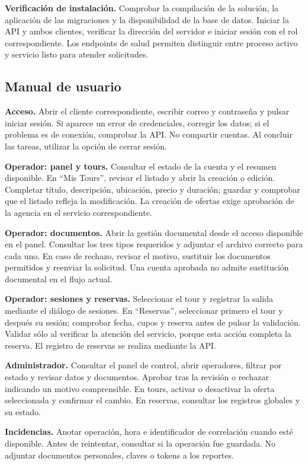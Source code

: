 \textbf{Verificación de instalación.} Comprobar la compilación de la solución, la aplicación de las migraciones y la disponibilidad de la base de datos. Iniciar la API y ambos clientes, verificar la dirección del servidor e iniciar sesión con el rol correspondiente. Los endpoints de salud permiten distinguir entre proceso activo y servicio listo para atender solicitudes.

\subsection{Manual de usuario}
\textbf{Acceso.} Abrir el cliente correspondiente, escribir correo y contraseña y pulsar iniciar sesión. Si aparece un error de credenciales, corregir los datos; si el problema es de conexión, comprobar la API. No compartir cuentas. Al concluir las tareas, utilizar la opción de cerrar sesión.

\textbf{Operador: panel y tours.} Consultar el estado de la cuenta y el resumen disponible. En ``Mis Tours'', revisar el listado y abrir la creación o edición. Completar título, descripción, ubicación, precio y duración; guardar y comprobar que el listado refleja la modificación. La creación de ofertas exige aprobación de la agencia en el servicio correspondiente.

\textbf{Operador: documentos.} Abrir la gestión documental desde el acceso disponible en el panel. Consultar los tres tipos requeridos y adjuntar el archivo correcto para cada uno. En caso de rechazo, revisar el motivo, sustituir los documentos permitidos y reenviar la solicitud. Una cuenta aprobada no admite sustitución documental en el flujo actual.

\textbf{Operador: sesiones y reservas.} Seleccionar el tour y registrar la salida mediante el diálogo de sesiones. En ``Reservas'', seleccionar primero el tour y después su sesión; comprobar fecha, cupos y reserva antes de pulsar la validación. Validar sólo al verificar la atención del servicio, porque esta acción completa la reserva. El registro de reservas se realiza mediante la API.

\textbf{Administrador.} Consultar el panel de control, abrir operadores, filtrar por estado y revisar datos y documentos. Aprobar tras la revisión o rechazar indicando un motivo comprensible. En tours, activar o desactivar la oferta seleccionada y confirmar el cambio. En reservas, consultar los registros globales y su estado.

\textbf{Incidencias.} Anotar operación, hora e identificador de correlación cuando esté disponible. Antes de reintentar, consultar si la operación fue guardada. No adjuntar documentos personales, claves o tokens a los reportes.
